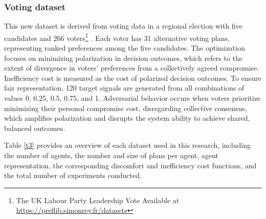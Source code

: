 \documentclass[journal]{IEEEtran}
\begin{document}
\subsubsection{Voting dataset}
This new dataset is derived from voting data in a regional election with five candidates and 266 voters\footnote{The UK Labour Party Leadership Vote Available at \url{https://preflib.simonrey.fr/datasets}} \cite{majumdar2024score}. Each voter has 31 alternative voting plans, representing ranked preferences among the five candidates.  The optimization focuses on minimizing polarization in decision outcomes, which refers to the extent of divergence in voters’ preferences from a collectively agreed compromise. Inefficiency cost is measured as the cost of polarized decision outcomes. To ensure fair representation, 120 target signals are generated from all combinations of values 0, 0.25, 0.5, 0.75, and 1. Adversarial behavior occurs when voters prioritize minimizing their personal compromise cost, disregarding collective consensus, which amplifies polarization and disrupts the system ability to achieve shared, balanced outcomes.

Table \ref{t3} provides an overview of each dataset used in this research, including the number of agents, the number and size of plans per agent, agent representation, the corresponding discomfort and inefficiency cost functions, and the total number of experiments conducted.
\end{document}
